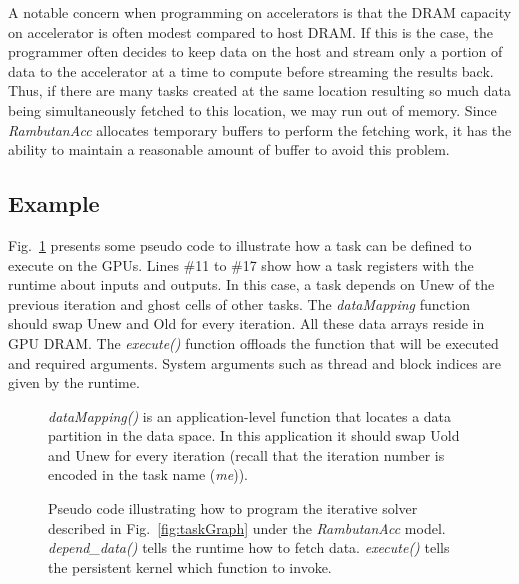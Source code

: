 A notable concern when programming on accelerators is that the DRAM capacity on accelerator is often modest compared to host DRAM.
If this is the case, the programmer often decides to keep data on the host and stream only a portion of data to the accelerator at a time to compute before streaming the results back.
Thus, if there are many tasks created at the same location resulting so much data being simultaneously fetched to this location, we may run out of memory.
Since {\em RambutanAcc} allocates temporary buffers to perform the fetching work, it has the ability to maintain a reasonable amount of buffer to avoid this problem.


\subsection{Example}
Fig.~\ref{fig:firstProgram} presents some pseudo code to illustrate how a task can be defined to execute on the GPUs.
Lines \#11 to \#17 show how a task registers with the runtime about inputs and outputs.
In this case, a task depends on Unew of the previous iteration and ghost cells of other tasks.
The {\em dataMapping} function should swap Unew and Old for every iteration.
All these data arrays reside in GPU DRAM.
The {\em execute()} function offloads the function that will be executed and required arguments.
System arguments such as thread and block indices are given by the runtime.


\begin{figure}[htp]

\caption{Pseudo code illustrating how to program the iterative solver described in Fig.~\ref{fig:taskGraph} under the {\em RambutanAcc} model. {\em depend\_data()} tells the runtime how to fetch data. 
{\em execute()} tells the persistent kernel which function to invoke.}
{\em dataMapping()} is an application-level function that locates a data partition in the data space. In this application it should swap Uold and Unew for every iteration (recall that the iteration number is encoded in the task name ({\em me})).
\label{fig:firstProgram}
\end{figure}

